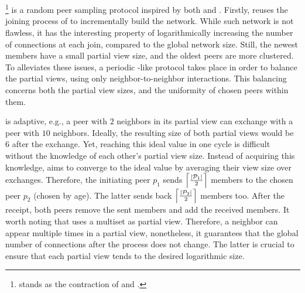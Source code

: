 
\section{\SCAMPLON{}}
\label{sec:proposal}

\SCAMPLON{}\footnote{\SCAMPLON{} stands as the contraction of \SCAMP{} and
  \CYCLON{}.} is a random peer sampling protocol inspired by both \SCAMP{} and
\CYCLON{}.  Firstly, \SCAMPLON{} reuses the joining process of \SCAMP{} to
incrementally build the network. While such network is not flawless, it has the
interesting property of logarithmically increasing the number of connections at
each join, compared to the global network size. Still, the newest members have
a small partial view size, and the oldest peers are more clustered. To
alleviates these issues, a periodic \CYCLON{}-like protocol takes place in
order to balance the partial views, using only neighbor-to-neighbor
interactions. This balancing concerns both the partial view sizes, and the
uniformity of chosen peers within them.

\SCAMPLON{} is adaptive, e.g., a peer with $2$ neighbors in its partial view
can exchange with a peer with $10$ neighbors. Ideally, the resulting size of
both partial views would be $6$ after the exchange. Yet, reaching this ideal
value in one cycle is difficult without the knowledge of each other's partial
view size. Instead of acquiring this knowledge, \SCAMPLON{} aims to converge to
the ideal value by averaging their view size over exchanges. Therefore, the
initiating peer $p_1$ sends $\left\lceil|\mathcal{P}_1|\over{2}\right\rceil$
members to the chosen peer $p_2$ (chosen by age). The latter sends back
$\left\lceil|\mathcal{P}_2|\over{2}\right\rceil$ members too. After the
receipt, both peers remove the sent members and add the received members. It
worth noting that \SCAMPLON{} uses a multiset as partial view. Therefore, a
neighbor can appear multiple times in a partial view, nonetheless, it
guarantees that the global number of connections after the process does not
change. The latter is crucial to ensure that each partial view tends to the
desired logarithmic size.

